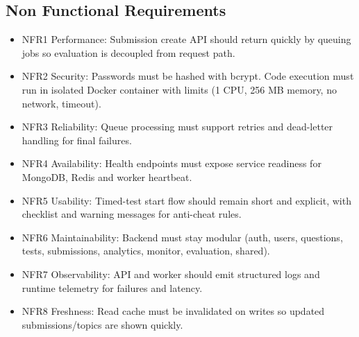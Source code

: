 \documentclass[12pt,journal,onecolumn]{IEEEtran}
\begin{document}
\subsection{Non Functional Requirements}
\begin{itemize}
    \item NFR1 Performance: Submission create API should return quickly by queuing jobs so evaluation is decoupled from request path.
    \item NFR2 Security: Passwords must be hashed with bcrypt. Code execution must run in isolated Docker container with limits (1 CPU, 256 MB memory, no network, timeout).
    \item NFR3 Reliability: Queue processing must support retries and dead-letter handling for final failures.
    \item NFR4 Availability: Health endpoints must expose service readiness for MongoDB, Redis and worker heartbeat.
    \item NFR5 Usability: Timed-test start flow should remain short and explicit, with checklist and warning messages for anti-cheat rules.
    \item NFR6 Maintainability: Backend must stay modular (auth, users, questions, tests, submissions, analytics, monitor, evaluation, shared).
    \item NFR7 Observability: API and worker should emit structured logs and runtime telemetry for failures and latency.
    \item NFR8 Freshness: Read cache must be invalidated on writes so updated submissions/topics are shown quickly.
\end{itemize}
\end{document}
